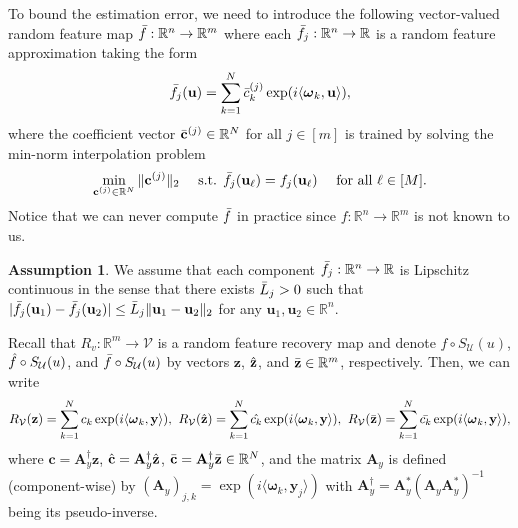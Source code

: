 \documentclass[11pt,twoside]{article}
\theoremstyle{plain}
\theoremstyle{definition}
\newtheorem{assumption}{Assumption}
\theoremstyle{remark}
\newcommand{\R}{\mathbb{R}}
\newcommand{\Ab}{\mathbf{A}}
\newcommand{\yb}{\mathbf{y}}
\newcommand{\cb}{\mathbf{c}}
\newcommand{\zb}{\mathbf{z}}
\newcommand{\ub}{\mathbf{u}}
\newcommand{\Uc}{\mathcal{U}}
\newcommand{\Vc}{\mathcal{V}}
\newcommand{\omegab}{\boldsymbol\omega}
\begin{document}
To bound the estimation error, we need to introduce the following vector-valued random feature map $\Bar{f}:\R^n\to\R^m$ where each $\Bar{f}_j:\R^n\to\R$ is a random feature approximation taking the form
\begin{equation}
\label{operator_temp}
\Bar{f}_j(\ub) = \sum_{k=1}^N \Bar{c}_k^{(j)} \exp(i\langle \omegab_k,\ub\rangle),
\end{equation}
where the coefficient vector $\Bar{\cb}^{(j)}\in\R^N$ for all $j\in[m]$ is trained by solving the min-norm interpolation problem
\begin{equation*}
\min_{\cb^{(j)}\in\R^N} \|\cb^{(j)}\|_2 \quad \mbox{ s.t. } \Bar{f}_j(\ub_\ell) = f_j(\ub_\ell) \quad \mbox{ for all } \ell\in[M].
\end{equation*}
Notice that we can never compute $\Bar{f}$ in practice since $f:\R^n\to\R^m$ is not known to us. 
\begin{assumption}
\label{Assmps:Lipschitz_f_bar}
We assume that each component $\Bar{f}_j:\R^n\to\R$ is Lipschitz continuous in the sense that there exists $\Bar{L}_j>0$ such that $|\Bar{f}_j(\ub_1) - \Bar{f}_j(\ub_2)| \leq \Bar{L}_j\|\ub_1 - \ub_2\|_2$ for any $\ub_1,\ub_2\in\R^n$.
\end{assumption}
Recall that $R_v:\R^m\to\Vc$ is a random feature recovery map and denote $f\circ S_\Uc(u)$, $\Hat{f}\circ S_\Uc(u)$, and $\Bar{f}\circ S_\Uc(u)$ by vectors $\zb$, $\Hat{\zb}$, and $\Bar{\zb}\in\R^m$, respectively. Then, we can write
\begin{equation*}
\begin{aligned}
R_\Vc (\zb) = \sum_{k=1}^N c_k \exp(i\langle \omegab_k,\yb\rangle), \hspace{0.05in} R_\Vc(\Hat{\zb}) = \sum_{k=1}^N \Hat{c_k} \exp(i\langle \omegab_k,\yb\rangle), \hspace{0.05in} R_\Vc(\Bar{\zb}) = \sum_{k=1}^N \Bar{c_k} \exp(i\langle \omegab_k,\yb\rangle),
\end{aligned}
\end{equation*}
where $\cb = \Ab^\dagger_y \zb$, $\Hat{\cb} = \Ab^\dagger_y\Hat{\zb}$, $\Bar{\cb} = \Ab^\dagger_y \Bar{\zb}\in\R^N$, and the matrix $\Ab_y$ is defined (component-wise) by $(\Ab_y)_{j,k} = \exp(i\langle \omegab_k, \yb_j\rangle)$ with $\Ab^\dagger_y=\Ab_y^*(\Ab_y\Ab_y^*)^{-1}$ being its pseudo-inverse. 
\end{document}
